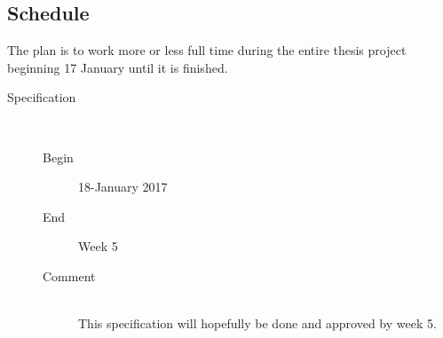 \documentclass[a4paper,11pt]{report}
\begin{document}
\subsection*{Schedule}
The plan is to work more or less full time during the entire thesis project
beginning 17 January until it is finished.
\begin{description}
    \item [Specification] \hfill\\
        \begin{description}
            \item[Begin] 18-January 2017
            \item[End] Week 5
            \item[Comment]\hfill \\
                This specification will hopefully be done and approved by 
                week 5.
        \end{description}


\end{description}
\end{document}
